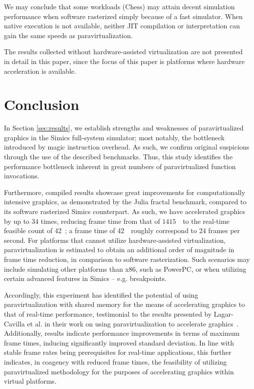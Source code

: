 \documentclass{article}
\newcommand{\masccite}[2][]{\cite{#2}}
\begin{document}
We may conclude that some workloads (Chess) may attain decent simulation performance when software rasterized simply because of a fast simulator.
When native execution is not available, neither JIT compilation or interpretation can gain the same speeds as paravirtualization.

The results collected without hardware-assisted virtualization are not presented in detail in this paper, since the focus of this paper is platforms where hardware acceleration is available.

\section{Conclusion}
\label{sec:conclusion}
In Section \ref{sec:results}, we establish strengths and weaknesses of paravirtualized graphics in the Simics full-system simulator; most notably, the bottleneck introduced by magic instruction overhead.
As such, we confirm original suspicions through the use of the described benchmarks.
Thus, this study identifies the performance bottleneck inherent in great numbers of paravirtualized function invocations.

Furthermore, compiled results showcase great improvements for computationally intensive graphics, as demonstrated by the Julia fractal benchmark, compared to its software rasterized Simics counterpart.
As such, we have accelerated graphics by up to $34$ times, reducing frame time from that of $1415$~\milli\second\ to the real-time feasible count of 42~\milli\second ; a frame time of 42~\milli\second\ roughly correspond to 24 frames per second.
For platforms that cannot utilize hardware-assisted virtualization, paravirtualization is estimated to obtain an additional order of magnitude in frame time reduction, in comparison to software rasterization.
Such scenarios may include simulating other platforms than x86, such as PowerPC, or when utilizing certain advanced features in Simics -- e.g. breakpoints.

Accordingly, this experiment has identified the potential of using paravirtualization with shared memory for the means of accelerating graphics to that of real-time performance, testimonial to the results presented by Lagar-Cavilla et al. in their work on using paravirtualization to accelerate graphics~\masccite{inproceedings:lagarcavilla:2007}.
Additionally, results indicate performance improvements in terms of maximum frame times, inducing significantly improved standard deviation.
In line with stable frame rates being prerequisites for real-time applications, this further indicates, in coagency with reduced frame times, the feasibility of utilizing paravirtualized methodology for the purposes of accelerating graphics within virtual platforms.
\end{document}
